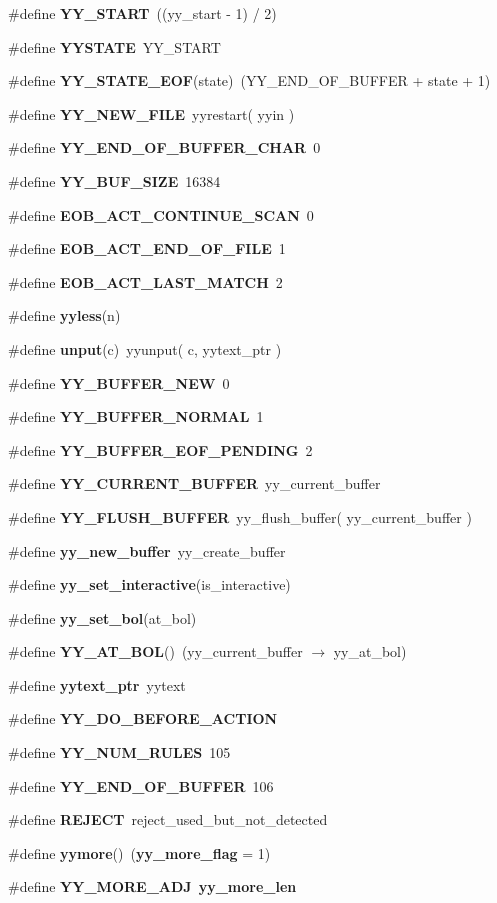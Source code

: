 \begin{CompactItemize}
\#define {\bf YY\_\-START}\ ((yy\_\-start - 1) / 2)
\item 
\#define {\bf YYSTATE}\ YY\_\-START
\item 
\#define {\bf YY\_\-STATE\_\-EOF}(state)\ (YY\_\-END\_\-OF\_\-BUFFER + state + 1)
\item 
\#define {\bf YY\_\-NEW\_\-FILE}\ yyrestart( yyin )
\item 
\#define {\bf YY\_\-END\_\-OF\_\-BUFFER\_\-CHAR}\ 0
\item 
\#define {\bf YY\_\-BUF\_\-SIZE}\ 16384
\item 
\#define {\bf EOB\_\-ACT\_\-CONTINUE\_\-SCAN}\ 0
\item 
\#define {\bf EOB\_\-ACT\_\-END\_\-OF\_\-FILE}\ 1
\item 
\#define {\bf EOB\_\-ACT\_\-LAST\_\-MATCH}\ 2
\item 
\#define {\bf yyless}(n)
\item 
\#define {\bf unput}(c)\ yyunput( c, yytext\_\-ptr )
\item 
\#define {\bf YY\_\-BUFFER\_\-NEW}\ 0
\item 
\#define {\bf YY\_\-BUFFER\_\-NORMAL}\ 1
\item 
\#define {\bf YY\_\-BUFFER\_\-EOF\_\-PENDING}\ 2
\item 
\#define {\bf YY\_\-CURRENT\_\-BUFFER}\ yy\_\-current\_\-buffer
\item 
\#define {\bf YY\_\-FLUSH\_\-BUFFER}\ yy\_\-flush\_\-buffer( yy\_\-current\_\-buffer )
\item 
\#define {\bf yy\_\-new\_\-buffer}\ yy\_\-create\_\-buffer
\item 
\#define {\bf yy\_\-set\_\-interactive}(is\_\-interactive)
\item 
\#define {\bf yy\_\-set\_\-bol}(at\_\-bol)
\item 
\#define {\bf YY\_\-AT\_\-BOL}()\ (yy\_\-current\_\-buffer $\rightarrow$ yy\_\-at\_\-bol)
\item 
\#define {\bf yytext\_\-ptr}\ yytext
\item 
\#define {\bf YY\_\-DO\_\-BEFORE\_\-ACTION}
\item 
\#define {\bf YY\_\-NUM\_\-RULES}\ 105
\item 
\#define {\bf YY\_\-END\_\-OF\_\-BUFFER}\ 106
\item 
\#define {\bf REJECT}\ reject\_\-used\_\-but\_\-not\_\-detected
\item 
\#define {\bf yymore}()\ ({\bf yy\_\-more\_\-flag} = 1)
\item 
\#define {\bf YY\_\-MORE\_\-ADJ}\ {\bf yy\_\-more\_\-len}

\end{CompactItemize}
